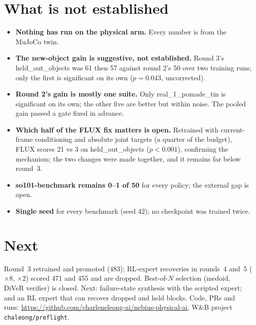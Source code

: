 \documentclass[10pt]{article}
\newcommand{\repo}{https://github.com/charleneleong-ai/nebius-physical-ai}
\begin{document}
\section{What is not established}
\begin{itemize}\itemsep0pt
\item \textbf{Nothing has run on the physical arm.} Every number is from the MuJoCo twin.
\item \textbf{The new-object gain is suggestive, not established.} Round 3's held\_out\_objects was 61 then 57 against round 2's
50 over two training runs; only the first is significant on its own ($p=0.043$, uncorrected).
\item \textbf{Round 2's gain is mostly one suite.} Only real\_1\_pomade\_tin is significant on its own; the other five are
better but within noise. The pooled gain passed a gate fixed in advance.
\item \textbf{Which half of the FLUX fix matters is open.} Retrained with current-frame conditioning and absolute joint targets
(a quarter of the budget), FLUX scores 21 vs 3 on held\_out\_objects ($p<0.001$), confirming the mechanism; the two changes
were made together, and it remains far below round~3.
\item \textbf{so101-benchmark remains 0--1 of 50} for every policy; the external gap is open.
\item \textbf{Single seed} for every benchmark (seed 42); no checkpoint was trained twice.
\end{itemize}

\section{Next}
Round~3 retrained and promoted (483); RL-expert recoveries in rounds~4 and~5 ($\times8$, $\times2$) scored 471 and 455 and are dropped.
Best-of-$N$ selection (medoid, DiVeR verifier) is closed. Next: failure-state synthesis with the scripted expert; and an RL
expert that can recover dropped and held blocks. Code, PRs and runs: \url{\repo}, W\&B project \texttt{chaleong/preflight}.
\end{document}
